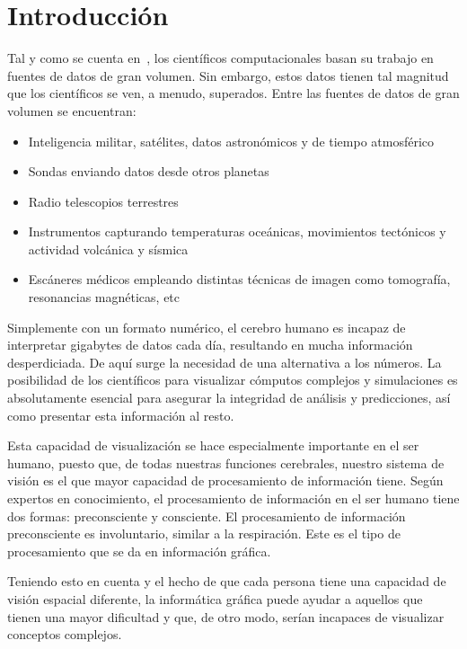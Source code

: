 \cleardoublepage

\chapter{Introducción}
\label{makereference}

Tal y como se cuenta en~\citet{DEFANTI1991247}, los científicos computacionales
basan su trabajo en fuentes de datos de gran volumen. Sin embargo, estos datos
tienen tal magnitud que los científicos se ven, a menudo, superados. Entre las
fuentes de datos de gran volumen se encuentran:

\begin{itemize}
		\item Inteligencia militar, satélites, datos astronómicos y de tiempo atmosférico
		\item Sondas enviando datos desde otros planetas
		\item Radio telescopios terrestres
		\item Instrumentos capturando temperaturas oceánicas, movimientos tectónicos y 
				actividad volcánica y sísmica
		\item Escáneres médicos empleando distintas técnicas de imagen como tomografía, 
				resonancias magnéticas, etc
\end{itemize}

Simplemente con un formato numérico, el cerebro humano es incapaz de interpretar
gigabytes de datos cada día, resultando en mucha información desperdiciada. De
aquí surge la necesidad de una alternativa a los números. La posibilidad de los
científicos para visualizar cómputos complejos y simulaciones es absolutamente
esencial para asegurar la integridad de análisis y predicciones, así como
presentar esta información al resto.

Esta capacidad de visualización se hace especialmente importante en el ser
humano, puesto que, de todas nuestras funciones cerebrales, nuestro sistema de
visión es el que mayor capacidad de procesamiento de información tiene. Según
expertos en conocimiento, el procesamiento de información en el ser humano tiene
dos formas: preconsciente y consciente. El procesamiento de información
preconsciente es involuntario, similar a la respiración. Este es el tipo de
procesamiento que se da en información gráfica.
\cite{Rohrer:2000:SBI:510378.510552}

Teniendo esto en cuenta y el hecho de que cada persona tiene una capacidad de
visión espacial diferente, la informática gráfica puede ayudar a aquellos que
tienen una mayor dificultad y que, de otro modo, serían incapaces de visualizar
conceptos complejos.

